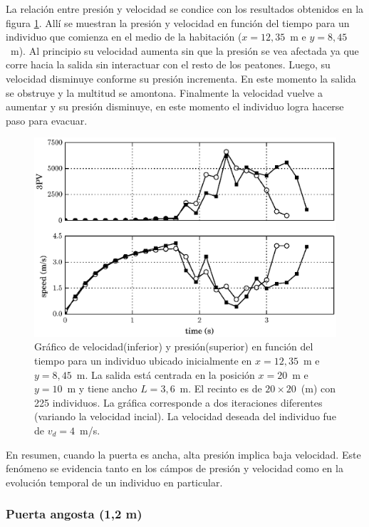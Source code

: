 La relación entre presión y velocidad se condice con los resultados obtenidos en la figura \ref{pv_vel_t_100_3_6}. Allí se muestran la presión y velocidad en función del tiempo para un individuo que comienza en el medio de la habitación ($x=12,35$~m e $y=8,45$~m). Al principio su velocidad aumenta sin que la presión se vea afectada ya que corre hacia la salida sin interactuar con el resto de los peatones. Luego, su velocidad disminuye conforme su presión incrementa. En este momento la salida se obstruye y la multitud se amontona. Finalmente la velocidad vuelve a aumentar y su presión disminuye, en este momento el individuo logra hacerse paso para evacuar. 

\begin{figure}[H]
    \centering
    \includegraphics[scale=0.8]{figuras/pv_vel_t_100_3_6.eps}
    \caption[width=5cm]{Gráfico de velocidad(inferior) y presión(superior) en función del tiempo para un individuo ubicado inicialmente en $x=12,35$~m e $y=8,45$~m.  La salida está centrada en la posición $x=20$~m e $y=10$~m y tiene ancho $L=3,6$~m. El recinto es de $20\times 20$~(m) con 225 individuos. La gráfica corresponde a dos iteraciones diferentes (variando la velocidad incial). La velocidad deseada del individuo fue de $v_d=4$~m/s.}
    \label{pv_vel_t_100_3_6}
\end{figure}

En resumen, cuando la puerta es ancha, alta presión implica baja velocidad. Este fenómeno se evidencia tanto en los cámpos de presión y velocidad como en la evolución temporal de un individuo en particular. 

\subsubsection{Puerta angosta (1,2 m)}


